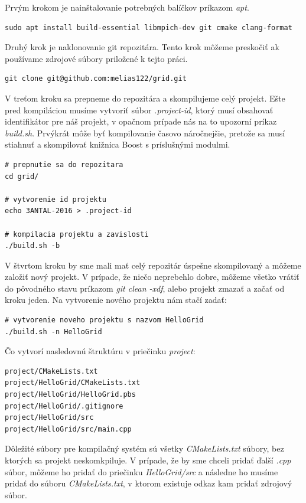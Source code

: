 Prvým krokom je nainštalovanie potrebných balíčkov príkazom \textit{apt}.
\begin{lstlisting}
sudo apt install build-essential libmpich-dev git cmake clang-format
\end{lstlisting}

Druhý krok je naklonovanie git repozitára. Tento krok môžeme preskočiť ak používame zdrojové súbory priložené k tejto práci.
\begin{lstlisting}
git clone git@github.com:melias122/grid.git
\end{lstlisting}

V treťom kroku sa prepneme do repozitára a skompilujeme celý projekt.
Ešte pred kompiláciou musíme vytvoriť súbor \textit{.project-id}, ktorý musí obsahovať
identifikátor pre náš projekt, v opačnom prípade nás na to upozorní príkaz \textit{build.sh}.
Prvýkrát môže byť kompilovanie časovo náročnejšie, pretože sa musí stiahnuť a skompilovať knižnica Boost s príslušnými modulmi. 
\begin{lstlisting}
# prepnutie sa do repozitara
cd grid/

# vytvorenie id projektu
echo 3ANTAL-2016 > .project-id

# kompilacia projektu a zavislosti
./build.sh -b
\end{lstlisting}

V štvrtom kroku by sme mali mať celý repozitár úspešne skompilovaný a môžeme založiť nový projekt.
V prípade, že niečo neprebehlo dobre, môžeme všetko vrátiť do pôvodného stavu príkazom \textit{git clean -xdf}, alebo projekt zmazať a začať od kroku jeden.
Na vytvorenie nového projektu nám stačí zadať:
\begin{lstlisting}
# vytvorenie noveho projektu s nazvom HelloGrid
./build.sh -n HelloGrid
\end{lstlisting}
Čo vytvorí nasledovnú štruktúru v priečinku \textit{project}:
\begin{lstlisting}
project/CMakeLists.txt
project/HelloGrid/CMakeLists.txt
project/HelloGrid/HelloGrid.pbs
project/HelloGrid/.gitignore
project/HelloGrid/src
project/HelloGrid/src/main.cpp
\end{lstlisting}
Dôležité súbory pre kompilačný systém sú všetky \textit{CMakeLists.txt} súbory, bez ktorých sa projekt neskomkpiluje.
V prípade, že by sme chceli pridať ďalší \textit{.cpp} súbor, môžeme ho pridať do priečinku \textit{HelloGrid/src} a následne ho musíme pridať do
súboru \textit{CMakeLists.txt}, v ktorom existuje odkaz kam pridať zdrojový súbor.

